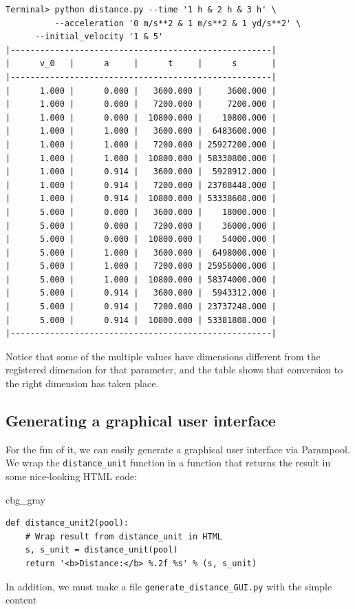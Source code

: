 \documentclass[graybox,envcountchap,sectrefs,final]{svmonodo}
\newenvironment{_cod_tight}[1]{
   \def\FrameCommand{\colorbox{#1}}
   \FrameRule0.6pt\MakeFramed {\FrameRestore}\vskip3mm}
   {\vskip0mm\endMakeFramed}
\newenvironment{cod}[1]{
\bgroup\rmfamily
\fboxsep=0mm\relax
\begin{_cod_tight}{#1}
\list{}{\parsep=-2mm\parskip=0mm\topsep=0pt\leftmargin=2mm
\rightmargin=2\leftmargin\leftmargin=4pt\relax}
\item\relax}
{\endlist\end{_cod_tight}\egroup}
\begin{document}
\begin{Verbatim}[frame=lines,label=\fbox{{\tiny Terminal}},framesep=2.5mm,framerule=0.7pt,fontsize=\fontsize{9pt}{9pt}]
Terminal> python distance.py --time '1 h & 2 h & 3 h' \ 
          --acceleration '0 m/s**2 & 1 m/s**2 & 1 yd/s**2' \ 
	  --initial_velocity '1 & 5'
|-----------------------------------------------------|
|      v_0   |      a     |      t     |      s       |
|-----------------------------------------------------|
|      1.000 |      0.000 |   3600.000 |     3600.000 |
|      1.000 |      0.000 |   7200.000 |     7200.000 |
|      1.000 |      0.000 |  10800.000 |    10800.000 |
|      1.000 |      1.000 |   3600.000 |  6483600.000 |
|      1.000 |      1.000 |   7200.000 | 25927200.000 |
|      1.000 |      1.000 |  10800.000 | 58330800.000 |
|      1.000 |      0.914 |   3600.000 |  5928912.000 |
|      1.000 |      0.914 |   7200.000 | 23708448.000 |
|      1.000 |      0.914 |  10800.000 | 53338608.000 |
|      5.000 |      0.000 |   3600.000 |    18000.000 |
|      5.000 |      0.000 |   7200.000 |    36000.000 |
|      5.000 |      0.000 |  10800.000 |    54000.000 |
|      5.000 |      1.000 |   3600.000 |  6498000.000 |
|      5.000 |      1.000 |   7200.000 | 25956000.000 |
|      5.000 |      1.000 |  10800.000 | 58374000.000 |
|      5.000 |      0.914 |   3600.000 |  5943312.000 |
|      5.000 |      0.914 |   7200.000 | 23737248.000 |
|      5.000 |      0.914 |  10800.000 | 53381808.000 |
|-----------------------------------------------------|

\end{Verbatim}
Notice that some of the multiple values have dimensions different
from the registered dimension for that parameter, and the table
shows that conversion to the right dimension has taken place.


\subsection{Generating a graphical user interface}

For the fun of it, we can easily generate a graphical user interface
via Parampool. We wrap the \Verb!distance_unit! function in a function that
returns the result in some nice-looking HTML code:

\begin{cod}{cbg_gray}\begin{Verbatim}[numbers=none,fontsize=\fontsize{9pt}{9pt},baselinestretch=0.95,xleftmargin=2mm]
def distance_unit2(pool):
    # Wrap result from distance_unit in HTML
    s, s_unit = distance_unit(pool)
    return '<b>Distance:</b> %.2f %s' % (s, s_unit)
\end{Verbatim}
\end{cod}
\noindent
In addition, we must make a file \Verb!generate_distance_GUI.py! with the
simple content
\end{document}
